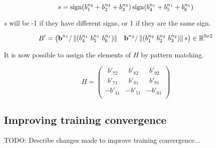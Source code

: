 \[
s = \operatorname{sign}(b^{n_2}_1 + b^{n_2}_2 + b^{n_2}_3) \operatorname{sign}(b^{n_1}_4 + b^{n_1}_5 + b^{n_1}_6)
\]

$s$ will be -1 if they have different signs, or 1 if they are the same sign.

\[
B'=
\begin{pmatrix}
\textbf{b}^{n_1} / \left\lVert(b^{n_1}_4 \ b^{n_1}_5 \ b^{n_1}_6)
\right\rVert &
\textbf{b}^{n_2} / \left\lVert(b^{n_2}_1 \ b^{n_2}_2 \ b^{n_2}_3)\right\rVert s
\end{pmatrix}
\in \mathbb{R}^{9x2}
\]

It is now possible to assign the elements of $H$ by pattern matching.

\[
H=
\begin{pmatrix}
\ \ b'_{72} & \ \ b'_{82} & \ \ b'_{92} \\
\ \ b'_{71} & \ \ b'_{81} & \ \ b'_{91} \\
-b'_{41} & -b'_{51} & -b'_{61} \\
\end{pmatrix}
\]

\subsection{Improving training convergence}

TODO: Describe changes made to improve training convergence...